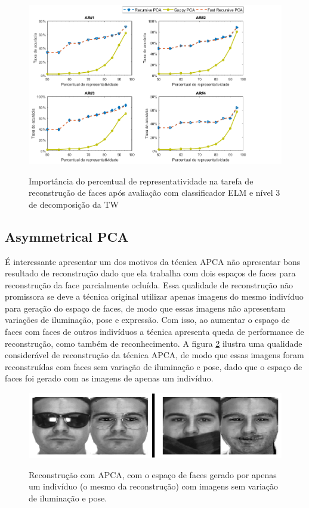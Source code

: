 \begin{figure}[H]
\centering
\caption{Importância do percentual de representatividade na tarefa de reconstrução de faces após avaliação com classificador ELM e nível 3 de decomposição da TW}
\includegraphics[scale=0.65]{imgs4/evolucao_percentual_representatividade}
\label{fig:evolucao_percentual_representatividade}
\end{figure}





\subsection{Asymmetrical PCA}
É interessante apresentar um dos motivos da técnica APCA não apresentar bons resultado de reconstrução dado que ela trabalha com dois espaços de faces para reconstrução da face parcialmente ocluída. Essa qualidade de reconstrução não promissora se deve a técnica original utilizar apenas imagens do mesmo indivíduo para geração do espaço de faces, de modo que essas imagens não apresentam variações de iluminação, pose e expressão. Com isso, ao aumentar o espaço de faces com faces de outros indivíduos a técnica apresenta queda de performance de reconstrução, como também de reconhecimento. A figura \ref{fig:best_APCA} ilustra uma qualidade considerável de reconstrução da técnica APCA, de modo que essas imagens foram reconstruídas com faces sem variação de iluminação e pose, dado que o espaço de faces foi gerado com as imagens de apenas um indivíduo.

\begin{figure}[H]
\centering
\caption{Reconstrução com APCA, com o espaço de faces gerado por apenas um indivíduo (o mesmo da reconstrução) com imagens sem variação de iluminação e pose.}
\includegraphics[scale=0.60]{imgs3/best_apca}
\label{fig:best_APCA}
\end{figure}


